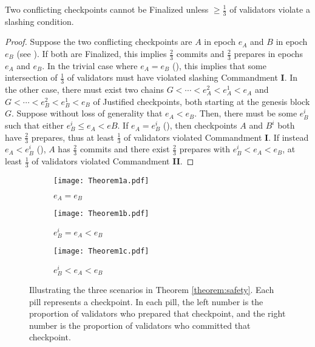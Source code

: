 \documentclass[12pt]{article}
\newcommand{\epoch}{\ensuremath{e}\xspace}
\newcommand{\Genesisblock}{\ensuremath{G}\xspace}
\begin{document}
\begin{theorem}
\label{theorem:safety}
Two conflicting checkpoints cannot be Finalized unless $\geq \frac{1}{3}$ of validators violate a slashing condition.

\begin{proof}
Suppose the two conflicting checkpoints are $A$ in epoch $\epoch_A$ and $B$ in epoch $\epoch_B$ (see ). If both are Finalized, this implies $\frac{2}{3}$ commits and $\frac{2}{3}$ prepares in epochs $\epoch_A$ and $e_B$. In the trivial case where $\epoch_A = \epoch_B$ (), this implies that some intersection of $\frac{1}{3}$ of validators must have violated slashing Commandment \textbf{I}. In the other case, there must exist two chains $\Genesisblock < \cdots < \epoch_A^2 < \epoch_A^1 < \epoch_A$ and $\Genesisblock < \cdots < \epoch_B^2 < \epoch_B^1 < \epoch_B$ of Justified checkpoints, both starting at the genesis block $\Genesisblock$. Suppose without loss of generality that $\epoch_A < \epoch_B$. Then, there must be some $\epoch_B^i$ such that either $\epoch_B^i \leq \epoch_A < \epoch B$.  If $\epoch_A = \epoch_B^i$ (), then checkpoints $A$ and $B^i$ both have $\frac{2}{3}$ prepares, thus at least $\frac{1}{3}$ of validators violated Commandment \textbf{I}.  If instead $\epoch_A < \epoch_B^i$ (), $A$ has $\frac{2}{3}$ commits and there exist $\frac{2}{3}$ prepares with $\epoch_B^i < \epoch_A < \epoch_B$, at least $\frac{1}{3}$ of validators violated Commandment \textbf{II}. 
\end{proof}
\end{theorem}


\begin{figure}[h!tb]
\centering
   \begin{subfigure}[b]{0.45\textwidth}
   \centering
   \texttt{[image: Theorem1a.pdf]}
	\caption{$\epoch_A = \epoch_B$}
	\label{fig:2a}	
	\end{subfigure}
	
\begin{subfigure}[b]{0.45\textwidth}
   \centering
   \texttt{[image: Theorem1b.pdf]}
	\caption{$\epoch_B^i = \epoch_A < \epoch_B$}
	\label{fig:2b}	
	\end{subfigure} \hspace{0.05\textwidth} 	 \begin{subfigure}[b]{0.45\textwidth}
   \centering
   \texttt{[image: Theorem1c.pdf]}
	\caption{$\epoch_B^i < \epoch_A < \epoch_B$}
	\label{fig:2c}	
	\end{subfigure}

\caption{Illustrating the three scenarios in Theorem \ref{theorem:safety}.  Each pill represents a checkpoint.  In each pill, the left number is the proportion of validators who prepared that checkpoint, and the right number is the proportion of validators who committed that checkpoint.}
\label{fig:conflicting_checkpoints}
\end{figure}
\end{document}
